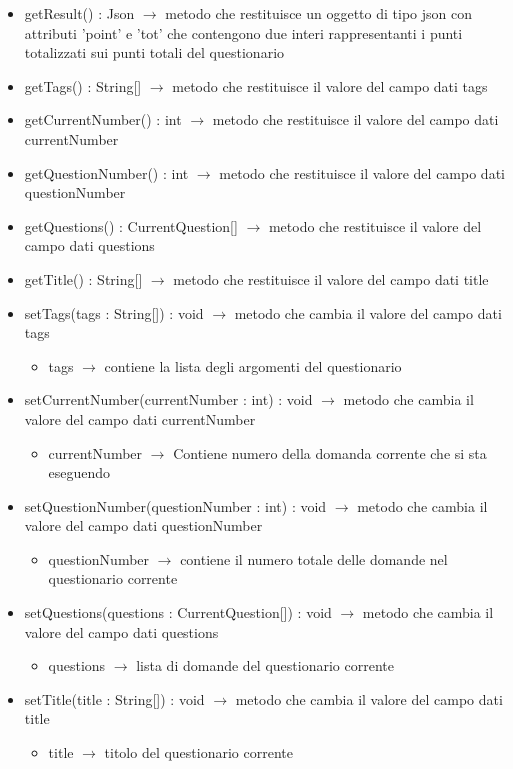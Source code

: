 \begin{description}
\begin{itemize}
	\item getResult() : Json $\rightarrow$ metodo che restituisce un oggetto di tipo json con attributi 'point' e 'tot' che contengono due interi rappresentanti i punti totalizzati sui punti totali del questionario
	\item getTags() : String[] $\rightarrow$ metodo che restituisce il valore del campo dati tags
	\item getCurrentNumber() : int $\rightarrow$ metodo che restituisce il valore del campo dati currentNumber
	\item getQuestionNumber() : int $\rightarrow$ metodo che restituisce il valore del campo dati questionNumber
	\item getQuestions() : CurrentQuestion[] $\rightarrow$ metodo che restituisce il valore del campo dati questions
	\item getTitle() : String[] $\rightarrow$ metodo che restituisce il valore del campo dati title
	\item setTags(tags : String[]) : void $\rightarrow$ metodo che cambia il valore del campo dati tags\begin{itemize}
		\item tags $\rightarrow$ contiene la lista degli argomenti del questionario
	\end{itemize}
	
	\item setCurrentNumber(currentNumber : int) : void $\rightarrow$ metodo che cambia il valore del campo dati currentNumber\begin{itemize}
		\item currentNumber $\rightarrow$  Contiene numero della domanda corrente che si sta eseguendo
	\end{itemize}
	
	\item setQuestionNumber(questionNumber : int) : void $\rightarrow$ metodo che cambia il valore del campo dati questionNumber\begin{itemize}
		\item questionNumber $\rightarrow$ contiene il numero totale delle domande nel questionario corrente
	\end{itemize}
	
	\item setQuestions(questions : CurrentQuestion[]) : void $\rightarrow$ metodo che cambia il valore del campo dati questions\begin{itemize}
		\item questions $\rightarrow$ lista di domande del questionario corrente
	\end{itemize}
	
	\item setTitle(title : String[]) : void $\rightarrow$ metodo che cambia il valore del campo dati title\begin{itemize}
		\item title $\rightarrow$ titolo del questionario corrente
	\end{itemize}
	
\end{itemize}

\end{description}

